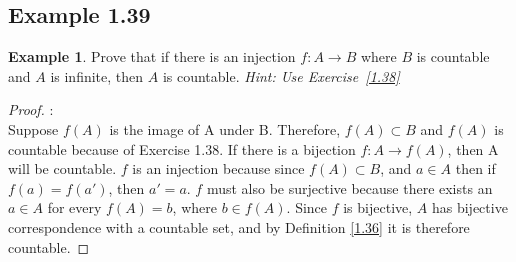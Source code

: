 \documentclass[openany, amssymb, psamsfonts]{amsart}
\theoremstyle{definition}
\newtheorem{exmp}{Example}[section]
\numberwithin{equation}{section}
\begin{document}
\subsection{Example 1.39}
\label{1.39}
\begin{exmp}
    Prove that if there is an injection $f:A\longrightarrow B$ where $B$ is countable and $A$ is infinite,  then $A$ is countable. {\it Hint: Use Exercise~\ref{1.38}}
\end{exmp}
\begin{proof}:\\
    Suppose $f(A)$ is the image of A under B. Therefore, $f(A)\subset B$ and $f(A)$ is countable because of Exercise 1.38. If there is a bijection $f:A\rightarrow f(A)$, then A will be countable. $f$ is an injection because since $f(A)\subset B$, and $a\in A$ then if $f(a)=f(a')$, then $a'=a$. $f$ must also be surjective because there exists an $a\in A$ for every $f(A)=b$, where $b\in f(A)$. Since $f$ is bijective, $A$ has bijective correspondence with a countable set, and by Definition \ref{1.36} it is therefore countable.
\end{proof}
\end{document}
